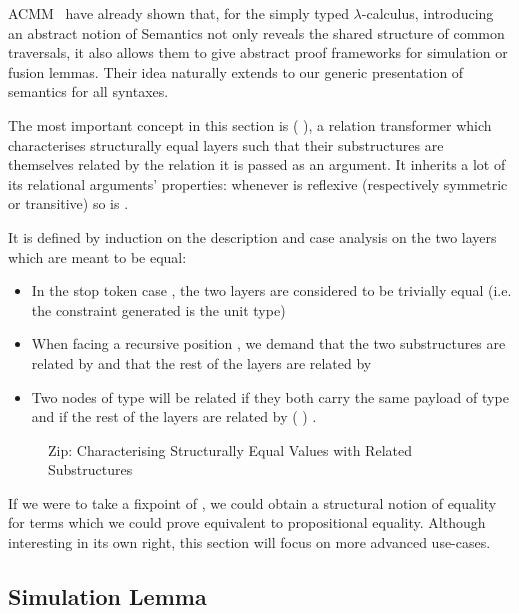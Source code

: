 ACMM~\citeyear{allais2017type} have
already shown that, for the simply typed $\lambda$-calculus, introducing an abstract
notion of Semantics not only reveals the shared structure of common
traversals, it also allows them to give abstract proof frameworks for
simulation or fusion lemmas. Their idea naturally extends to our generic
presentation of semantics for all syntaxes.

The most important concept in this section is ( ), a relation
transformer which characterises structurally equal layers such that their
substructures are themselves related by the relation it is passed as an
argument. It inherits a lot of its relational arguments' properties: whenever
 is reflexive (respectively symmetric or transitive) so is {  }.\label{lem:zipstable}

It is defined by induction on the description and case analysis on the two
layers which are meant to be equal:
\begin{itemize}
  \item In the stop token case  , the two layers are considered to
    be trivially equal (i.e. the constraint generated is the unit type)
  \item When facing a recursive position { \AB{$\Delta$}  }, we
    demand that the two substructures are related by { \AB{$\Delta$} }
    and that the rest of the layers are related by   
  \item Two nodes of type {  } will
    be related if they both carry the same payload  of type  and if
    the rest of the layers are related by { ( ) }.
\end{itemize}

\begin{figure}[h]
\caption{Zip: Characterising Structurally Equal Values with Related Substructures}
\end{figure}

If we were to take a fixpoint of , we could obtain a structural
notion of equality for terms which we could prove equivalent to propositional
equality. Although interesting in its own right, this section will focus
on more advanced use-cases.



\subsection{Simulation Lemma}\label{section:simulation}

